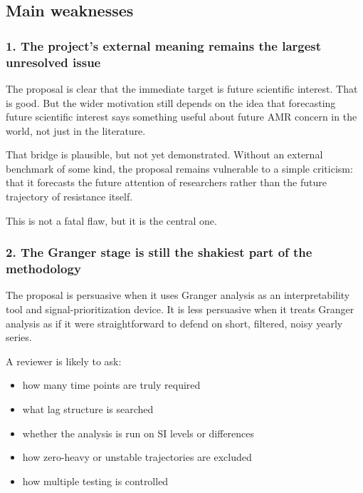 \subsection{Main weaknesses}\label{main-weaknesses}

\subsubsection{1. The project's external meaning remains the largest
unresolved
issue}\label{the-projects-external-meaning-remains-the-largest-unresolved-issue}

The proposal is clear that the immediate target is future scientific
interest. That is good. But the wider motivation still depends on the
idea that forecasting future scientific interest says something useful
about future AMR concern in the world, not just in the literature.

That bridge is plausible, but not yet demonstrated. Without an external
benchmark of some kind, the proposal remains vulnerable to a simple
criticism: that it forecasts the future attention of researchers rather
than the future trajectory of resistance itself.

This is not a fatal flaw, but it is the central one.

\subsubsection{2. The Granger stage is still the shakiest part of the
methodology}\label{the-granger-stage-is-still-the-shakiest-part-of-the-methodology}

The proposal is persuasive when it uses Granger analysis as an
interpretability tool and signal-prioritization device. It is less
persuasive when it treats Granger analysis as if it were straightforward
to defend on short, filtered, noisy yearly series.

A reviewer is likely to ask:

\begin{itemize}
\tightlist
\item
  how many time points are truly required
\item
  what lag structure is searched
\item
  whether the analysis is run on SI levels or differences
\item
  how zero-heavy or unstable trajectories are excluded
\item
  how multiple testing is controlled
\end{itemize}

